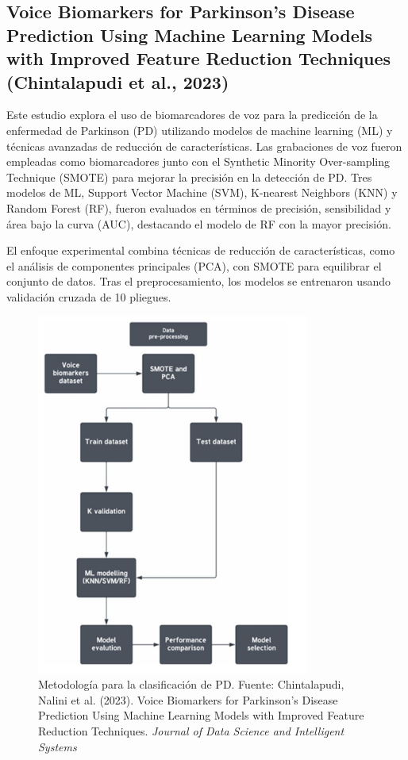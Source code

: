 \documentclass[listof=nochaptergap,12pt,times,authoryear]{report}
\begin{document}
\subsection{Voice Biomarkers for Parkinson's Disease Prediction Using Machine Learning Models with Improved Feature Reduction Techniques (Chintalapudi et al., 2023)}


Este estudio explora el uso de biomarcadores de voz para la predicción de la enfermedad de Parkinson (PD) utilizando modelos de machine learning (ML) y técnicas avanzadas de reducción de características. Las grabaciones de voz fueron empleadas como biomarcadores junto con el Synthetic Minority Over-sampling Technique (SMOTE) para mejorar la precisión en la detección de PD. Tres modelos de ML, Support Vector Machine (SVM), K-nearest Neighbors (KNN) y Random Forest (RF), fueron evaluados en términos de precisión, sensibilidad y área bajo la curva (AUC), destacando el modelo de RF con la mayor precisión.

El enfoque experimental combina técnicas de reducción de características, como el análisis de componentes principales (PCA), con SMOTE para equilibrar el conjunto de datos. Tras el preprocesamiento, los modelos se entrenaron usando validación cruzada de 10 pliegues.

\begin{figure}[H]
    \centering
    \includegraphics[width=0.8\textwidth]{A6 - 1.png}
    \caption{Metodología para la clasificación de PD. Fuente: Chintalapudi, Nalini et al. (2023). Voice Biomarkers for Parkinson's Disease Prediction Using Machine Learning Models with Improved Feature Reduction Techniques. \textit{Journal of Data Science and Intelligent Systems}}
\end{figure}
\end{document}
